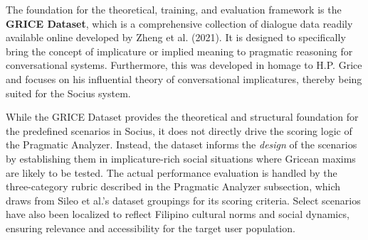     The foundation for the theoretical, training, and evaluation framework is the \textbf{GRICE Dataset}, which is a comprehensive collection of dialogue data readily available online developed by Zheng et al. (2021). It is designed to specifically bring the concept of implicature or implied meaning to pragmatic reasoning for conversational systems. Furthermore, this was developed in homage to H.P. Grice and focuses on his influential theory of conversational implicatures, thereby being suited for the Socius system. 

    While the GRICE Dataset provides the theoretical and structural foundation for the 
    predefined scenarios in Socius, it does not directly drive the scoring logic of the 
    Pragmatic Analyzer. Instead, the dataset informs the \textit{design} of the scenarios 
    by establishing them in implicature-rich social situations where Gricean maxims are 
    likely to be tested. The actual performance evaluation is handled by the three-category 
    rubric described in the Pragmatic Analyzer subsection, which draws from Sileo et al.'s 
    dataset groupings for its scoring criteria. Select scenarios have also been localized 
    to reflect Filipino cultural norms and social dynamics, ensuring relevance and 
    accessibility for the target user population.



